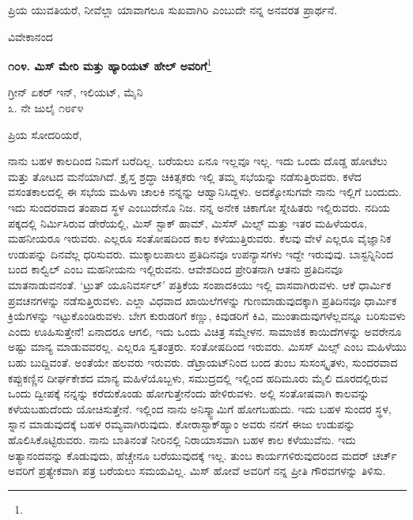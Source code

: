 ಪ್ರಿಯ ಯುವತಿಯರೆ, ನೀವೆಲ್ಲಾ ಯಾವಾಗಲೂ ಸುಖವಾಗಿರಿ ಎಂಬುದೇ ನನ್ನ ಅನವರತ ಪ್ರಾರ್ಥನೆ.

{\flushright
ವಿವೇಕಾನಂದ\par}

\begin{center}
\textbf{೧೦೪. ಮಿಸ್ ಮೇರಿ ಮತ್ತು ಹ್ಯಾರಿಯಟ್ ಹೇಲ್‌ ಅವರಿಗೆ}\footnote{}
\end{center}

\begin{flushright}
ಗ್ರೀನ್ ಏಕರ್‌ ಇನ್‌, ಇಲಿಯಟ್, ಮೈನಿ\\೩. ನೇ ಜುಲೈ ೧೮೯೪
\end{flushright}

\noindent
ಪ್ರಿಯ ಸೋದರಿಯರೆ,



ನಾನು ಬಹಳ ಕಾಲದಿಂದ ನಿಮಗೆ ಬರೆದಿಲ್ಲ. ಬರೆಯಲು ಏನೂ ಇಲ್ಲವೂ ಇಲ್ಲ. ಇದು ಒಂದು ದೊಡ್ಡ ಹೋಟೆಲು ಮತ್ತು ತೋಟದ ಮನೆಯಾಗಿದೆ. ಕ್ರೈಸ್ತ ಶ್ರದ್ಧಾ ಚಿಕಿತ್ಸಕರು  ಇಲ್ಲಿ ತಮ್ಮ ಸಭೆಯನ್ನು ನಡೆಸುತ್ತಿರುವರು. ಕಳೆದ ವಸಂತಕಾಲದಲ್ಲಿ ಈ ಸಭೆಯ ಮಹಿಳಾ ಚಾಲಕಿ ನನ್ನನ್ನು ಆಹ್ವಾನಿಸಿದ್ದಳು. ಅದಕ್ಕೋಸುಗವೇ ನಾನು ಇಲ್ಲಿಗೆ ಬಂದುದು. ಇದು ಸುಂದರವಾದ ತಂಪಾದ ಸ್ಥಳ ಎಂಬುದೇನೊ ನಿಜ. ನನ್ನ ಅನೇಕ ಚಿಕಾಗೋ ಸ್ನೇಹಿತರು ಇಲ್ಲಿರುವರು. ನದಿಯ ಪಕ್ಕದಲ್ಲಿ ನಿರ್ಮಿಸಿರುವ ಡೇರೆಯಲ್ಲಿ, ಮಿಸ್ ಸ್ಟಾಕ್ ಹಾಮ್, ಮಿಸೆಸ್ ಮಿಲ್ಸ್ ಮತ್ತು ಇತರ ಮಹಿಳೆಯರೂ, ಮಹನೀಯರೂ ಇರುವರು. ಎಲ್ಲರೂ ಸಂತೋಷದಿಂದ ಕಾಲ ಕಳೆಯುತ್ತಿರುವರು. ಕೆಲವು ವೇಳೆ ಎಲ್ಲರೂ ವೈಜ್ಞಾನಿಕ ಉಡುಪನ್ನು ದಿನವೆಲ್ಲ ಧರಿಸುವರು. ಮುಕ್ಕಾಲುಪಾಲು ಪ್ರತಿದಿನವೂ ಉಪನ್ಯಾಸಗಳು ಇದ್ದೇ ಇರುವುವು. ಬಾಸ್ಟನ್ನಿನಿಂದ ಬಂದ ಕಾಲ್ವಿಲ್ ಎಂಬ ಮಹನೀಯನು ಇಲ್ಲಿರುವನು. ಆವೇಶದಿಂದ ಪ್ರೇರಿತನಾಗಿ ಆತನು ಪ್ರತಿದಿನವೂ ಮಾತನಾಡುವನಂತೆ. `ಟ್ರುತ್ ಯೂನಿವರ್ಸಲ್' ಪತ್ರಿಕೆಯ ಸಂಪಾದಕಿಯು ಇಲ್ಲಿ ವಾಸವಾಗಿರುವಳು. ಆಕೆ ಧಾರ್ಮಿಕ ಪ್ರವಚನಗಳನ್ನು ನಡೆಸುತ್ತಿರುವಳು. ಎಲ್ಲಾ ವಿಧವಾದ ಖಾಯಿಲೆಗಳನ್ನು ಗುಣಮಾಡುವುದಕ್ಕಾಗಿ ಪ್ರತಿದಿನವೂ ಧಾರ್ಮಿಕ ಕ್ರಿಯೆಗಳನ್ನು ಇಟ್ಟುಕೊಂಡಿರುವಳು. ಬೇಗ ಕುರುಡರಿಗೆ ಕಣ್ಣು, ಕಿವುಡರಿಗೆ ಕಿವಿ, ಮುಂತಾದುವುಗಳೆಲ್ಲವನ್ನೂ ಬರಿಸುವಳು ಎಂದು ಊಹಿಸುತ್ತೇನೆ! ಏನಾದರೂ ಆಗಲಿ, ಇದು ಒಂದು ವಿಚಿತ್ರ ಸಮ್ಮೇಳನ. ಸಾಮಾಜಿಕ ಕಾಯಿದೆಗಳನ್ನು ಅವರೇನೂ ಅಷ್ಟು ಮಾನ್ಯ ಮಾಡುವವರಲ್ಲ. ಎಲ್ಲರೂ ಸ್ವತಂತ್ರರು. ಸಂತೋಷದಿಂದ ಇರುವರು. ಮಿಸಸ್ ಮಿಲ್ಸ್ ಎಂಬ ಮಹಿಳೆಯು ಬಹು ಬುದ್ದಿವಂತೆ. ಅಂತೆಯೇ ಹಲವರು ಇರುವರು. ಡೆಟ್ರಾಯಟ್‌ನಿಂದ ಬಂದ ತುಂಬ ಸುಸಂಸ್ಕೃತಳು, ಸುಂದರವಾದ ಕಪ್ಪುಕಣ್ಣಿನ ದೀರ್ಘಕೇಶದ ಮಾನ್ಯ ಮಹಿಳೆಯೊಬ್ಬಳು, ಸಮುದ್ರದಲ್ಲಿ ಇಲ್ಲಿಂದ ಹದಿಮೂರು ಮೈಲಿ ದೂರದಲ್ಲಿರುವ ಒಂದು ದ್ವೀಪಕ್ಕೆ ನನ್ನನ್ನು ಕರೆದುಕೊಂಡು ಹೋಗುತ್ತೇನೆಂದು ಹೇಳಿರುವಳು. ಅಲ್ಲಿ ಸಂತೋಷವಾಗಿ ಕಾಲವನ್ನು ಕಳೆಯಬಹುದೆಂದು ಯೋಚಿಸುತ್ತೇನೆ. ಇಲ್ಲಿಂದ ನಾನು ಅನಿಸ್ಕ್ವಾಮಿಗೆ ಹೋಗಬಹುದು. ಇದು ಬಹಳ ಸುಂದರ ಸ್ಥಳ, ಸ್ನಾನ ಮಾಡುವುದಕ್ಕೆ ಬಹಳ ರಮ್ಯವಾಗಿರುವುದು. ಕೋರಾಸ್ಟಾಕ್‌ಹ್ಯಾಂ ಅವರು ನನಗೆ ಈಜು ಉಡುಪನ್ನು ಹೊಲಿಸಿಕೊಟ್ಟಿರುವರು. ನಾನು ಬಾತಿನಂತೆ ನೀರಿನಲ್ಲಿ ನಿರಾಯಾಸವಾಗಿ ಬಹಳ ಕಾಲ ಕಳೆಯುವೆನು. ಇದು ಅತ್ಯಾನಂದವನ್ನು ಕೊಡುವುದು, ಹೆಚ್ಚೇನೂ ಬರೆಯುವುದಕ್ಕೆ ಇಲ್ಲ. ತುಂಬ ಕಾರ್ಯಗಳಿರುವುದರಿಂದ ಮದರ್ ಚರ್ಚ್ ಅವರಿಗೆ ಪ್ರತ್ಯೇಕವಾಗಿ ಪತ್ರ ಬರೆಯಲು ಸಮಯವಿಲ್ಲ. ಮಿಸ್ ಹೋವೆ ಅವರಿಗೆ ನನ್ನ ಪ್ರೀತಿ ಗೌರವಗಳನ್ನು ತಿಳಿಸು.

